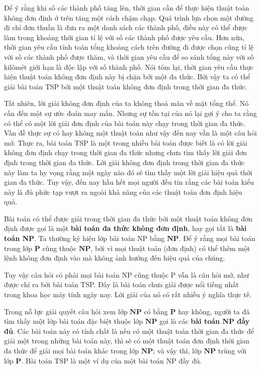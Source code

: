 Để ý rằng khi số các thành phố tăng lên, thời gian cần để thực hiện thuật toán không đơn
định ở trên tăng một cách chậm chạp. Quá trình lựa chọn một đường đi chỉ đơn thuần là đưa
ra một danh sách các thành phố, điều này có thể được làm trong khoảng thời gian tỉ lệ với
số các thành phố được yêu cầu. Hơn nữa, thời gian yêu cầu tính toán tổng khoảng cách trên
đường đi được chọn cũng tỉ lệ với số các thành phố được thăm, và thời gian yêu cầu để so
sánh tổng này với số kilômét giới hạn là độc lập với số thành phố. Nói tóm lại, thời gian
yêu cầu thực hiện thuật toán không đơn định này bị chặn bởi một đa thức. Bởi vậy ta có thể
giải bài toán TSP bởi một thuật toán không đơn định trong thời gian đa thức.

Tất nhiên, lời giải không đơn định của ta không thoả mãn về mặt tổng thể. Nó cần đến một
sự ước đoán may mắn. Nhưng sự tồn tại của nó lại gợi ý cho ta rằng có thể có một lời giải
đơn định của bài toán này chạy trong thời gian đa thức. Vấn đề thực sự có hay không một
thuật toán như vậy đến nay vẫn là một câu hỏi mở. Thực ra, bài toán TSP là một trong nhiều
bài toán được biết là có lời giải không đơn định chạy trong thời gian đa thức nhưng chưa
tìm thấy lời giải đơn định trong thời gian đa thức. Lời giải không đơn định trong thời
gian đa thức này làm ta hy vọng rằng một ngày nào đó sẽ tìm thấy một lời giải hiệu quả
thời gian đa thức. Tuy vậy, đến nay hầu hết mọi người đều tin rằng các bài toán kiểu này
là đủ phức tạp vượt ra ngoài khả năng của các thuật toán đơn định hiệu quả.

Bài toán có thể được giải trong thời gian đa thức bởi một thuật toán không đơn định được
gọi là một \textbf{bài toán đa thức không đơn định}, hay gọi tắt là \textbf{bài toán
  NP}. Ta thường ký hiệu lớp bài toán NP bằng $\mathbf{NP}$. Để ý rằng mọi bài toán trong
lớp $\mathbf{P}$ cũng thuộc $\mathbf{NP}$, bởi vì mọi thuật toán (đơn định) có thể thêm
một lệnh không đơn định vào mà không ảnh hưởng đến hiệu quả của chúng.

Tuy vậy câu hỏi có phải mọi bài toán NP cũng thuộc P vẫn là câu hỏi mở, như được chỉ ra
bởi bài toán TSP. Đây là bài toán chưa giải được nổi tiếng nhất trong khoa học máy tính
ngày nay. Lời giải của nó có rất nhiều ý nghĩa thực tế.

Trong nỗ lực giải quyết câu hỏi xem lớp $\mathbf{NP}$ có bằng $\mathbf{P}$ hay không,
người ta đã tìm thấy một lớp bài toán đặc biệt thuộc lớp $\mathbf{NP}$ gọi là các
\textbf{bài toán NP đầy đủ}. Các bài toán này có tính chất là nếu có một thuật toán thời
gian đa thức để giải một trong những bài toán này, thì sẽ có một thuật toán đơn định thời
gian đa thức để giải mọi bài toán khác trong lớp $\mathbf{NP}$; và vậy thì, lớp
$\mathbf{NP}$ trùng với lớp $\mathbf{P}$. Bài toán TSP là một ví dụ của một bài toán NP
đầy đủ.

